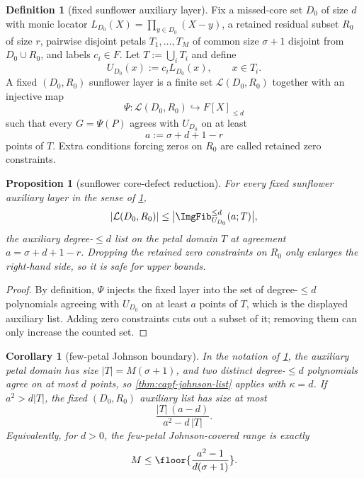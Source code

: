 \documentclass[11pt]{article}
\newtheorem{proposition}[proposition]{Proposition}
\newtheorem{corollary}[corollary]{Corollary}
\theoremstyle{definition}
\newtheorem{definition}[definition]{Definition}
\theoremstyle{remark}
\begin{document}
\begin{definition}[fixed sunflower auxiliary layer]\label{def:capf-sunflower-layer}
Fix a missed-core set $D_0$ of size $d$ with monic locator $L_{D_0}(X)=\prod_{y\in D_0}(X-y)$, a retained residual subset $R_0$ of size $r$, pairwise disjoint petals $T_1,\ldots,T_M$ of common size $\sigma+1$ disjoint from $D_0\cup R_0$, and labels $c_i\in F$.  Let $T:=\bigcup_iT_i$ and define
\[
        U_{D_0}(x):=c_iL_{D_0}(x),\qquad x\in T_i.
\]
A fixed $(D_0,R_0)$ sunflower layer is a finite set $\mathcal L(D_0,R_0)$ together with an injective map
\[
        \Psi:\mathcal L(D_0,R_0)\hookrightarrow F[X]_{\le d}
\]
such that every $G=\Psi(P)$ agrees with $U_{D_0}$ on at least
\[
        a:=\sigma+d+1-r
\]
points of $T$.  Extra conditions forcing zeros on $R_0$ are called retained zero constraints.
\end{definition}

\begin{proposition}[sunflower core-defect reduction]\label{prop:capf-pma}
For every fixed sunflower auxiliary layer in the sense of \cref{def:capf-sunflower-layer},
\[
        |\mathcal L(D_0,R_0)|
        \le
        \bigl|\ImgFib_{U_{D_0}}^{\le d}(a;T)\bigr|,
\]
the auxiliary degree-$\le d$ list on the petal domain $T$ at agreement $a=\sigma+d+1-r$.  Dropping the retained zero constraints on $R_0$ only enlarges the right-hand side, so it is safe for upper bounds.
\end{proposition}

\begin{proof}
By definition, $\Psi$ injects the fixed layer into the set of degree-$\le d$ polynomials agreeing with $U_{D_0}$ on at least $a$ points of $T$, which is the displayed auxiliary list.  Adding zero constraints cuts out a subset of it; removing them can only increase the counted set.
\end{proof}

\begin{corollary}[few-petal Johnson boundary]\label{cor:capf-pma-johnson}
In the notation of \cref{prop:capf-pma}, the auxiliary petal domain has size $|T|=M(\sigma+1)$, and two distinct degree-$\le d$ polynomials agree on at most $d$ points, so \cref{thm:capf-johnson-list} applies with $\kappa=d$.  If $a^2>d|T|$, the fixed $(D_0,R_0)$ auxiliary list has size at most
\[
        \frac{|T|\,(a-d)}{a^2-d\,|T|}.
\]
Equivalently, for $d>0$, the few-petal Johnson-covered range is exactly
\[
        M\le
        \floor{\frac{a^2-1}{d(\sigma+1)}}.
\]
\end{corollary}
\end{document}
